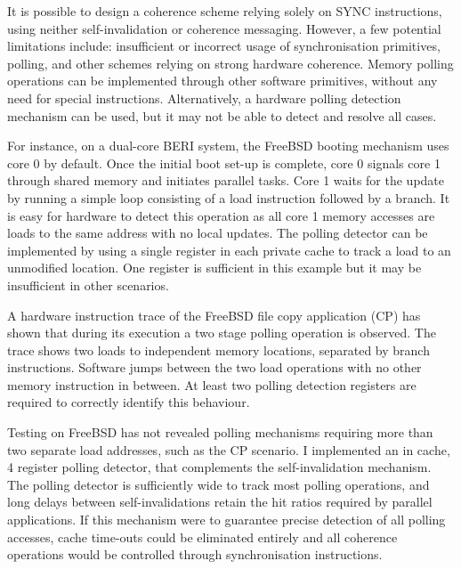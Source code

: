 	
	It is possible to design a coherence scheme relying solely on SYNC instructions, using neither self-invalidation or coherence messaging. However, a few potential limitations include: insufficient or incorrect usage of synchronisation primitives, polling, and other schemes relying on strong hardware coherence.
	Memory polling operations can be implemented through other software primitives, without any need for special instructions. Alternatively, a hardware polling detection mechanism can be used, but it may not be able to detect and resolve all cases.
	
	For instance, on a dual-core BERI system, the FreeBSD booting mechanism uses core 0 by default. Once the initial boot set-up is complete, core 0 signals core 1 through shared memory and initiates parallel tasks. Core 1 waits for the update by running a simple loop consisting of a load instruction followed by a branch. It is easy for hardware to detect this operation as all core 1 memory accesses are loads to the same address with no local updates. The polling detector can be implemented by using a single register in each private cache to track a load to an unmodified location. One register is sufficient in this example but it may be insufficient in other scenarios.
	
	A hardware instruction trace of the FreeBSD file copy application (CP) has shown that during its execution a two stage polling operation is observed. The trace shows two loads to independent memory locations, separated by branch instructions. Software jumps between the two load operations with no other memory instruction in between. At least two polling detection registers are required to correctly identify this behaviour. 
	
	Testing on FreeBSD has not revealed polling mechanisms requiring more than two separate load addresses, such as the CP scenario. I implemented an in cache, 4 register polling detector, that complements the self-invalidation mechanism. 
	The polling detector is sufficiently wide to track most polling operations, and long delays between self-invalidations retain the hit ratios required by parallel applications. If this mechanism were to guarantee precise detection of all polling accesses, cache time-outs could be eliminated entirely and all coherence operations would be controlled through synchronisation instructions.


